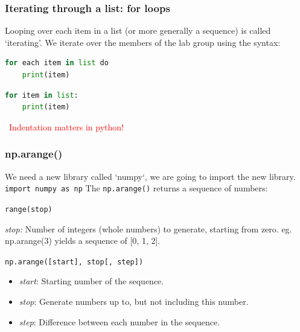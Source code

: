 \documentclass[handout]{beamer}
\begin{document}
\begin{frame}[fragile]
	\frametitle{Iterating through a list: for loops}
	
	Looping over each item in a list (or more generally a sequence) is called `iterating'. We iterate over the members of the lab group using the syntax:

	\begin{lstlisting}[language=Python]
for each item in list do
	print(item)
	\end{lstlisting}
	
	\begin{lstlisting}[language=Python]
for item in list:
	print(item)
	\end{lstlisting}
	
	\textcolor{red}{\faWarning ~Indentation matters in python!}
\end{frame}


\begin{frame}[fragile]
	\frametitle{np.arange()}
	We need a new library called `numpy`, we are going to import the new library.
	\verb|import numpy as np|
	The \verb|np.arange()| returns a sequence of numbers:
	
		\vspace{0.5cm}
		
		\verb|range(stop)|
		
		\vspace{0.5cm}
	
	\textit{stop:} Number of integers (whole numbers) to generate, starting from zero. eg. np.arange(3) yields a sequence of [0, 1, 2].
	
	\vspace{0.5cm}
	
	\verb|np.arange([start], stop[, step])|
	
	\begin{itemize}
		\item \textit{start}: Starting number of the sequence.
		\item \textit{stop}: Generate numbers up to, but not including this number.
		\item \textit{step}: Difference between each number in the sequence.
	\end{itemize}
	
\end{frame}
\end{document}
